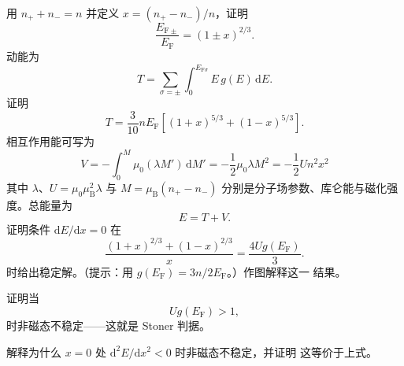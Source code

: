 用 $n_{+}+n_{-}=n$ 并定义 $x=(n_{+}-n_{-})/n$，证明
\begin{equation*}
\frac{E_{\mathrm{F}\pm}}{E_{\mathrm{F}}} = (1\pm x)^{2/3}.\tag{7.110}
\end{equation*}
动能为
\begin{equation*}
T = \sum_{\sigma=\pm}\int_{0}^{E_{\mathrm{F}\sigma}}E\,g(E)\,\mathrm{d}E.\tag{7.111}
\end{equation*}
证明
\begin{equation*}
T = \frac{3}{10}nE_{\mathrm{F}}\left[(1+x)^{5/3}+(1-x)^{5/3}\right].\tag{7.112}
\end{equation*}
相互作用能可写为
\begin{equation*}
V = -\int_{0}^{M}\mu_0(\lambda M')\,\mathrm{d}M' = -\frac{1}{2}\mu_0\lambda M^{2} = -\frac{1}{2}Un^{2}x^{2}\tag{7.113}
\end{equation*}
其中 $\lambda$、$U=\mu_0\mu_{\mathrm{B}}^{2}\lambda$ 与
$M=\mu_{\mathrm{B}}(n_{+}-n_{-})$ 分别是分子场参数、库仑能与磁化强度。总能量为
\begin{equation*}
E = T+V.\tag{7.114}
\end{equation*}
证明条件 $\mathrm{d}E/\mathrm{d}x=0$ 在
\begin{equation*}
\frac{(1+x)^{2/3}+(1-x)^{2/3}}{x} = \frac{4Ug(E_{\mathrm{F}})}{3}.\tag{7.115}
\end{equation*}
时给出稳定解。（提示：用 $g(E_{\mathrm{F}})=3n/2E_{\mathrm{F}}$。）作图解释这一
结果。

证明当
\begin{equation*}
Ug(E_{\mathrm{F}}) > 1,\tag{7.116}
\end{equation*}
时非磁态不稳定——这就是 Stoner 判据。

解释为什么 $x=0$ 处 $\mathrm{d}^{2}E/\mathrm{d}x^{2}<0$ 时非磁态不稳定，并证明
这等价于上式。
